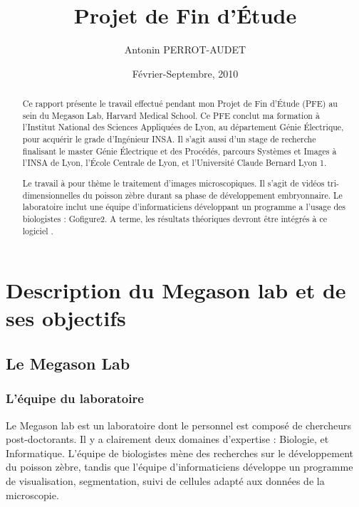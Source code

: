 




\title{Projet de Fin d'Étude}   %
\author{Antonin PERROT-AUDET}         %
\date{Février-Septembre, 2010}    %
\maketitle

\begin{abstract}
  Ce rapport présente le travail effectué pendant mon Projet de Fin d'Étude (PFE) au sein du Megason Lab, Harvard Medical School. Ce PFE conclut ma formation à l'Institut National des Sciences Appliquées de Lyon, au département Génie Électrique, pour acquérir le grade d'Ingénieur INSA. Il s'agit aussi d'un stage de recherche finalisant le master Génie Électrique et des Procédés, parcours Systèmes et Images à l'INSA de Lyon, l'École Centrale de Lyon, et l'Université Claude Bernard Lyon 1.
  
  Le travail à pour thème le traitement d'images microscopiques. Il s'agit de vidéos tri-dimensionnelles du poisson zèbre durant sa phase de développement embryonnaire. Le laboratoire inclut une équipe d'informaticiens développant un programme a l'usage des biologistes : Gofigure2\cite{refGofigure2}. A terme, les résultats théoriques devront être intégrés à ce logiciel .
  
  
\tableofcontents  
  
 
\end{abstract}



\chapter{Description du Megason lab et de ses objectifs} 

\section{Le Megason Lab}

\subsection{L'équipe du laboratoire}
Le Megason lab est un laboratoire dont le personnel est composé de chercheurs post-doctorants.
Il y a clairement deux domaines d'expertise : Biologie, et Informatique.
L'équipe de biologistes mène des recherches sur le développement du poisson zèbre,
tandis que l'équipe d'informaticiens développe un programme de visualisation,
segmentation, suivi de cellules adapté aux données de la microscopie.


